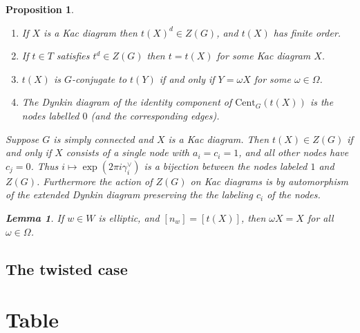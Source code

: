 \documentclass[10pt,leqno]{article}
\newtheorem{lemma}[equation]{Lemma}
\newtheorem{proposition}[equation]{Proposition}
\newcommand{\Cent}{\text{Cent}}
\newcommand{\ch}[1]{#1^\vee}
\renewcommand{\sec}[1]{\section{#1}
\renewcommand{\theequation}{\thesection.\arabic{equation}}
  \setcounter{equation}{0}}
\newcommand{\subsec}[1]{\subsection{#1}
\renewcommand{\theequation}{\thesubsection.\arabic{equation}}}
\renewcommand{\sec}[1]{\section{#1}
\renewcommand{\theequation}{\thesection.\arabic{equation}}
  \setcounter{equation}{0}}
\begin{document}
\begin{proposition}\hfil
\begin{enumerate}
\item   If $X$ is a Kac diagram then $t(X)^d\in Z(G)$, and $t(X)$ has finite order.
\item If $t\in T$ satisfies $t^d\in Z(G)$ then $t=t(X)$ for some Kac diagram $X$.
\item  $t(X)$ is $G$-conjugate to $t(Y)$ if and only if $Y=\omega X$ for some $\omega\in\Omega$.
\item The Dynkin diagram of the identity component of $\Cent_G(t(X))$
  is the nodes labelled $0$ (and the corresponding edges).
\end{enumerate}

\begin{exampleplain}
Suppose $G$ is simply connected and $X$ is a Kac diagram. Then
$t(X)\in Z(G)$ if and only if $X$ consists of a single node with
$a_i=c_i=1$, and all other nodes have $c_j=0$. Thus
$i\mapsto \exp(2\pi i\ch\gamma_i)$ is a bijection between the nodes
labeled $1$ and $Z(G)$. Furthermore the action of $Z(G)$ on Kac
diagrams is by automorphism of the extended Dynkin diagram preserving
the the labeling $c_i$ of the nodes. 
\end{exampleplain}


\begin{lemma}
If $w\in W$ is elliptic, and $[n_w]=[t(X)]$, then $\omega X=X$ for all $\omega\in\Omega$.
\end{lemma}

\subsec{The twisted case}
\label{s:kactwisted}

\end{proposition}












\sec{Table}



\end{document}
